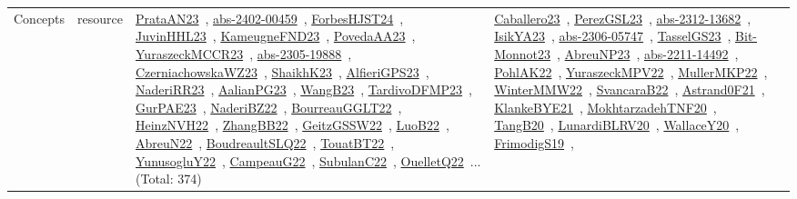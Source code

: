 {\begin{longtable}{lp{3cm}>{\raggedright\arraybackslash}p{6cm}>{\raggedright\arraybackslash}p{6cm}>{\raggedright\arraybackslash}p{8cm}}
Concepts & resource & \href{works/PrataAN23.pdf}{PrataAN23}~\cite{PrataAN23}, \href{works/abs-2402-00459.pdf}{abs-2402-00459}~\cite{abs-2402-00459}, \href{works/ForbesHJST24.pdf}{ForbesHJST24}~\cite{ForbesHJST24}, \href{works/JuvinHHL23.pdf}{JuvinHHL23}~\cite{JuvinHHL23}, \href{works/KameugneFND23.pdf}{KameugneFND23}~\cite{KameugneFND23}, \href{works/PovedaAA23.pdf}{PovedaAA23}~\cite{PovedaAA23}, \href{works/YuraszeckMCCR23.pdf}{YuraszeckMCCR23}~\cite{YuraszeckMCCR23}, \href{works/abs-2305-19888.pdf}{abs-2305-19888}~\cite{abs-2305-19888}, \href{works/CzerniachowskaWZ23.pdf}{CzerniachowskaWZ23}~\cite{CzerniachowskaWZ23}, \href{works/ShaikhK23.pdf}{ShaikhK23}~\cite{ShaikhK23}, \href{works/AlfieriGPS23.pdf}{AlfieriGPS23}~\cite{AlfieriGPS23}, \href{works/NaderiRR23.pdf}{NaderiRR23}~\cite{NaderiRR23}, \href{works/AalianPG23.pdf}{AalianPG23}~\cite{AalianPG23}, \href{works/WangB23.pdf}{WangB23}~\cite{WangB23}, \href{works/TardivoDFMP23.pdf}{TardivoDFMP23}~\cite{TardivoDFMP23}, \href{works/GurPAE23.pdf}{GurPAE23}~\cite{GurPAE23}, \href{works/NaderiBZ22.pdf}{NaderiBZ22}~\cite{NaderiBZ22}, \href{works/BourreauGGLT22.pdf}{BourreauGGLT22}~\cite{BourreauGGLT22}, \href{works/HeinzNVH22.pdf}{HeinzNVH22}~\cite{HeinzNVH22}, \href{works/ZhangBB22.pdf}{ZhangBB22}~\cite{ZhangBB22}, \href{works/GeitzGSSW22.pdf}{GeitzGSSW22}~\cite{GeitzGSSW22}, \href{works/LuoB22.pdf}{LuoB22}~\cite{LuoB22}, \href{works/AbreuN22.pdf}{AbreuN22}~\cite{AbreuN22}, \href{works/BoudreaultSLQ22.pdf}{BoudreaultSLQ22}~\cite{BoudreaultSLQ22}, \href{works/TouatBT22.pdf}{TouatBT22}~\cite{TouatBT22}, \href{works/YunusogluY22.pdf}{YunusogluY22}~\cite{YunusogluY22}, \href{works/CampeauG22.pdf}{CampeauG22}~\cite{CampeauG22}, \href{works/SubulanC22.pdf}{SubulanC22}~\cite{SubulanC22}, \href{works/OuelletQ22.pdf}{OuelletQ22}~\cite{OuelletQ22}... (Total: 374) & \href{works/Caballero23.pdf}{Caballero23}~\cite{Caballero23}, \href{works/PerezGSL23.pdf}{PerezGSL23}~\cite{PerezGSL23}, \href{works/abs-2312-13682.pdf}{abs-2312-13682}~\cite{abs-2312-13682}, \href{works/IsikYA23.pdf}{IsikYA23}~\cite{IsikYA23}, \href{works/abs-2306-05747.pdf}{abs-2306-05747}~\cite{abs-2306-05747}, \href{works/TasselGS23.pdf}{TasselGS23}~\cite{TasselGS23}, \href{works/Bit-Monnot23.pdf}{Bit-Monnot23}~\cite{Bit-Monnot23}, \href{works/AbreuNP23.pdf}{AbreuNP23}~\cite{AbreuNP23}, \href{works/abs-2211-14492.pdf}{abs-2211-14492}~\cite{abs-2211-14492}, \href{works/PohlAK22.pdf}{PohlAK22}~\cite{PohlAK22}, \href{works/YuraszeckMPV22.pdf}{YuraszeckMPV22}~\cite{YuraszeckMPV22}, \href{works/MullerMKP22.pdf}{MullerMKP22}~\cite{MullerMKP22}, \href{works/WinterMMW22.pdf}{WinterMMW22}~\cite{WinterMMW22}, \href{works/SvancaraB22.pdf}{SvancaraB22}~\cite{SvancaraB22}, \href{works/Astrand0F21.pdf}{Astrand0F21}~\cite{Astrand0F21}, \href{works/KlankeBYE21.pdf}{KlankeBYE21}~\cite{KlankeBYE21}, \href{works/MokhtarzadehTNF20.pdf}{MokhtarzadehTNF20}~\cite{MokhtarzadehTNF20}, \href{works/TangB20.pdf}{TangB20}~\cite{TangB20}, \href{works/LunardiBLRV20.pdf}{LunardiBLRV20}~\cite{LunardiBLRV20}, \href{works/WallaceY20.pdf}{WallaceY20}~\cite{WallaceY20}, \href{works/FrimodigS19.pdf}{FrimodigS19}~\cite{FrimodigS19}, 
\end{longtable}}
